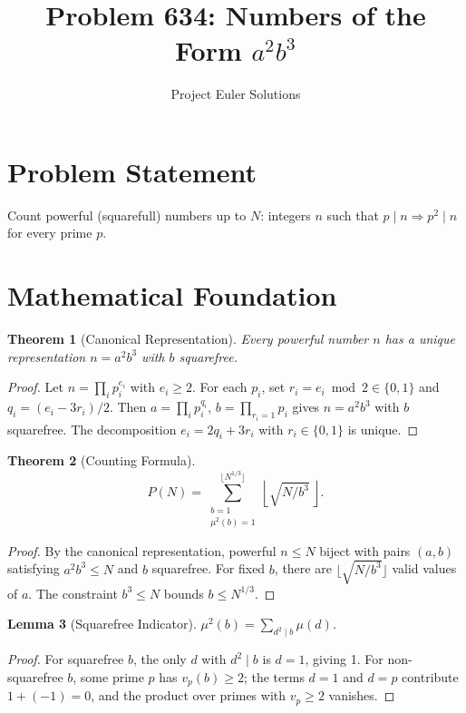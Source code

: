 \documentclass[11pt]{article}
\title{Problem 634: Numbers of the Form $a^2 b^3$}
\author{Project Euler Solutions}
\date{}
\newtheorem{theorem}{Theorem}
\newtheorem{lemma}[theorem]{Lemma}
\begin{document}
\maketitle

\section{Problem Statement}

Count powerful (squarefull) numbers up to $N$: integers $n$ such that $p\mid n \Rightarrow p^2\mid n$ for every prime $p$.

\section{Mathematical Foundation}

\begin{theorem}[Canonical Representation]
Every powerful number $n$ has a unique representation $n = a^2 b^3$ with $b$ squarefree.
\end{theorem}

\begin{proof}
Let $n = \prod_i p_i^{e_i}$ with $e_i \ge 2$. For each $p_i$, set $r_i = e_i \bmod 2 \in \{0,1\}$ and $q_i = (e_i - 3r_i)/2$. Then $a = \prod_i p_i^{q_i}$, $b = \prod_{r_i=1}p_i$ gives $n = a^2 b^3$ with $b$ squarefree. The decomposition $e_i = 2q_i + 3r_i$ with $r_i \in \{0,1\}$ is unique.
\end{proof}

\begin{theorem}[Counting Formula]
\[
P(N) = \sum_{\substack{b=1 \\ \mu^2(b)=1}}^{\lfloor N^{1/3}\rfloor} \left\lfloor \sqrt{N/b^3}\,\right\rfloor.
\]
\end{theorem}

\begin{proof}
By the canonical representation, powerful $n \le N$ biject with pairs $(a,b)$ satisfying $a^2 b^3 \le N$ and $b$ squarefree. For fixed $b$, there are $\lfloor\sqrt{N/b^3}\rfloor$ valid values of $a$. The constraint $b^3 \le N$ bounds $b \le N^{1/3}$.
\end{proof}

\begin{lemma}[Squarefree Indicator]
$\mu^2(b) = \sum_{d^2 \mid b}\mu(d)$.
\end{lemma}

\begin{proof}
For squarefree $b$, the only $d$ with $d^2\mid b$ is $d=1$, giving 1. For non-squarefree $b$, some prime $p$ has $v_p(b)\ge 2$; the terms $d=1$ and $d=p$ contribute $1+(-1)=0$, and the product over primes with $v_p \ge 2$ vanishes.
\end{proof}
\end{document}
